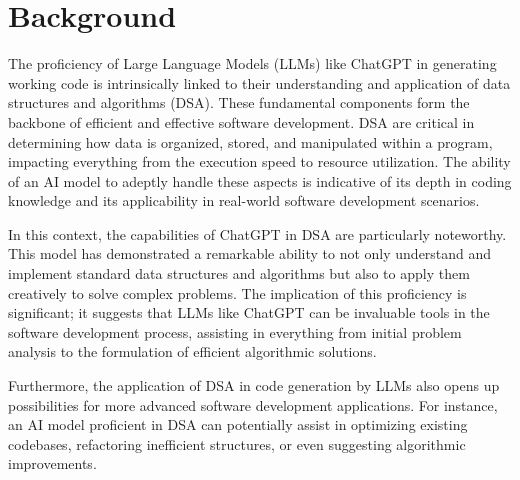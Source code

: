 
\section{Background}
\label{sec:into_back}



The proficiency of Large Language Models (LLMs) like ChatGPT in generating working code is 
intrinsically linked to their understanding and application of data structures and algorithms 
(DSA). These fundamental components form the backbone of efficient and effective software 
development. DSA are critical in determining how data is organized, stored, and manipulated 
within a program, impacting everything from the execution speed to resource utilization. The 
ability of an AI model to adeptly handle these aspects is indicative of its depth in coding 
knowledge and its applicability in real-world software development scenarios.

In this context, the capabilities of ChatGPT in DSA are particularly noteworthy. This model has 
demonstrated a remarkable ability to not only understand and implement standard data structures 
and algorithms but also to apply them creatively to solve complex problems. The implication of 
this proficiency is significant; it suggests that LLMs like ChatGPT can be invaluable tools in 
the software development process, assisting in everything from initial problem analysis to the 
formulation of efficient algorithmic solutions.

Furthermore, the application of DSA in code generation by LLMs also opens up possibilities for 
more advanced software development applications. For instance, an AI model proficient in DSA 
can potentially assist in optimizing existing codebases, refactoring inefficient structures, or 
even suggesting algorithmic improvements. 

